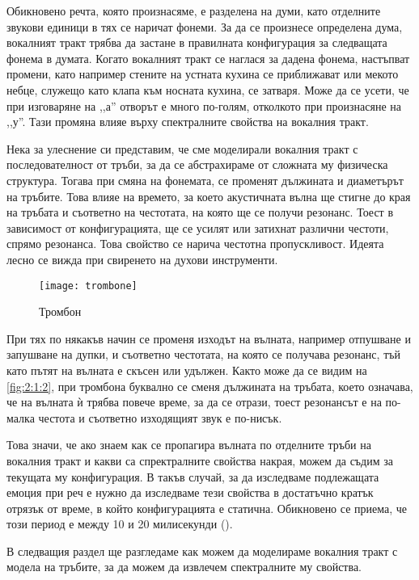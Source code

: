 \documentclass[main.tex]{subfiles}
\begin{document}
    Обикновено речта, която произнасяме, е разделена на думи, като отделните звукови единици в тях се наричат фонеми. За да се произнесе определена дума,
    вокалният тракт трябва да застане в правилната конфигурация за следващата фонема в думата. Когато
    вокалният тракт се наглася за дадена фонема, настъпват промени, като например стените на устната кухина се приближават или мекото небце, служещо като клапа към носната
    кухина, се затваря. Може да се усети, че при изговаряне на ,,а'' отворът е много по-голям, отколкото при произнасяне на ,,у''.
    Тази промяна влияе върху спектралните свойства на вокалния тракт.
    
    Нека за улеснение си представим, че сме моделирали вокалния тракт с последователност от тръби, за да се абстрахираме от сложната му физическа структура.
    Тогава при смяна на фонемата, се променят дължината и диаметърът на тръбите. Това влияе на времето, за което акустичната вълна ще стигне до края на тръбата
    и съответно на честотата, на която ще се получи резонанс. Тоест в зависимост от конфигурацията, ще се усилят или затихнат различни честоти, спрямо резонанса.
    Това свойство се нарича честотна пропускливост. Идеята лесно се вижда при свиренето на духови инструменти.

    \begin{figure}[ht]%
    \texttt{[image: trombone]}%
    \caption{Тромбон}%
    \label{fig:2:1:2}
    \end{figure}

    При тях по някакъв начин се променя изходът на вълната, например отпушване и запушване на дупки, и съответно честотата, на която се
    получава резонанс, тъй като пътят на вълната е скъсен или удължен. Както може да се видим на \autoref{fig:2:1:2}, при тромбона буквално се сменя дължината на тръбата,
    което означава, че на вълната ѝ трябва повече време, за да се отрази, тоест резонансът е на по-малка честота и съответно изходящият звук е по-нисък.

    Това значи, че ако знаем как се пропагира вълната по отделните тръби на вокалния тракт и
    какви са спректралните свойства накрая, можем да съдим за текущата му конфигурация.
    В такъв случай, за да изследваме подлежащата емоция при реч е нужно да изследваме тези свойства в достатъчно кратък отрязък от време,
    в който конфигурацията е статична. Обикновено се приема, че този период е между 10 и 20 милисекунди (\cite[стр.~98]{rabiner_schafer78}).
    
    В следващия раздел ще разгледаме как можем да моделираме вокалния тракт с модела на тръбите, за да можем да извлечем спектралните му свойства.
\end{document}
